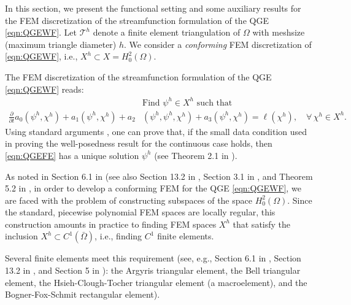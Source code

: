 In this section, we present the functional setting and some auxiliary results for the FEM
discretization of the streamfunction formulation of the QGE \eqref{eqn:QGEWF}. Let
$\mathcal{T}^h$ denote a finite element triangulation of $\Omega$ with meshsize (maximum triangle
diameter) $h$. We consider a \emph{conforming} FEM discretization of \eqref{eqn:QGEWF}, i.e., $X^h
\subset X = H_0^2(\Omega)$.

The FEM discretization of the streamfunction formulation of the QGE \eqref{eqn:QGEWF} reads: 
\begin{equation}
  \begin{split}
    &\text{Find } \psi^h \in X^h \text{ such that} \\ 
    \frac{\partial}{\partial t} a_0(\psi^h,\chi^h) + a_1(\psi^h,\chi^h) + a_2&(\psi^h,\psi^h,\chi^h)
      + a_3(\psi^h,\chi^h) = \ell(\chi^h),\quad \forall \, \chi^h \in X^h.
    \label{eqn:QGEFE}
  \end{split}
\end{equation}
Using standard arguments \cite{Girault79,Girault86}, one can prove that, if the small data condition
used in proving the well-posedness result for the continuous case holds, then \eqref{eqn:QGEFE} has
a unique solution $\psi^h$ (see Theorem 2.1 in \cite{Cayco86}). 

As noted in Section 6.1 in \cite{Ciarlet} (see also Section 13.2 in \cite{Gunzburger89}, Section 3.1
in \cite{Johnson}, and Theorem 5.2 in \cite{Braess}, in order to develop a conforming FEM for the
QGE \eqref{eqn:QGEWF}, we are faced with the problem of constructing subspaces of the space
$H^2_0(\Omega)$. Since the standard, piecewise polynomial FEM spaces are locally regular, this
construction amounts in practice to finding FEM spaces $X^h$ that satisfy the inclusion $X^h \subset
C^1({\bar \Omega})$, i.e., finding $C^1$ finite elements.

Several finite elements meet this requirement (see, e.g., Section 6.1 in \cite{Ciarlet}, Section
13.2 in \cite{Gunzburger89}, and Section 5 in \cite{Braess}): the Argyris triangular element, the
Bell triangular element, the Hsieh-Clough-Tocher triangular element (a macroelement), and the
Bogner-Fox-Schmit rectangular element).

